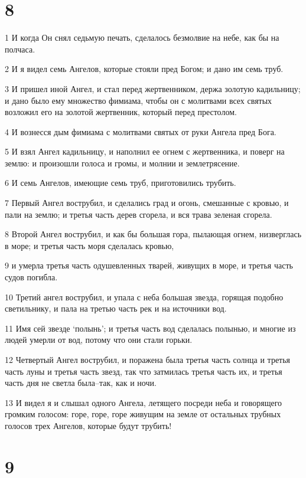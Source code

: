 \chapter{8}

\par 1 И когда Он снял седьмую печать, сделалось безмолвие на небе, как бы на полчаса.
\par 2 И я видел семь Ангелов, которые стояли пред Богом; и дано им семь труб.
\par 3 И пришел иной Ангел, и стал перед жертвенником, держа золотую кадильницу; и дано было ему множество фимиама, чтобы он с молитвами всех святых возложил его на золотой жертвенник, который перед престолом.
\par 4 И вознесся дым фимиама с молитвами святых от руки Ангела пред Бога.
\par 5 И взял Ангел кадильницу, и наполнил ее огнем с жертвенника, и поверг на землю: и произошли голоса и громы, и молнии и землетрясение.
\par 6 И семь Ангелов, имеющие семь труб, приготовились трубить.
\par 7 Первый Ангел вострубил, и сделались град и огонь, смешанные с кровью, и пали на землю; и третья часть дерев сгорела, и вся трава зеленая сгорела.
\par 8 Второй Ангел вострубил, и как бы большая гора, пылающая огнем, низверглась в море; и третья часть моря сделалась кровью,
\par 9 и умерла третья часть одушевленных тварей, живущих в море, и третья часть судов погибла.
\par 10 Третий ангел вострубил, и упала с неба большая звезда, горящая подобно светильнику, и пала на третью часть рек и на источники вод.
\par 11 Имя сей звезде `полынь'; и третья часть вод сделалась полынью, и многие из людей умерли от вод, потому что они стали горьки.
\par 12 Четвертый Ангел вострубил, и поражена была третья часть солнца и третья часть луны и третья часть звезд, так что затмилась третья часть их, и третья часть дня не светла была--так, как и ночи.
\par 13 И видел я и слышал одного Ангела, летящего посреди неба и говорящего громким голосом: горе, горе, горе живущим на земле от остальных трубных голосов трех Ангелов, которые будут трубить!

\chapter{9}

